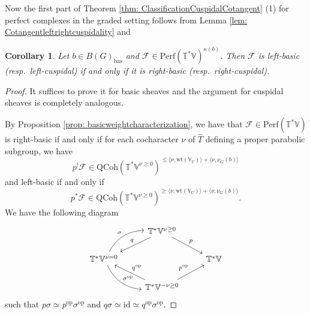 \documentclass{amsart}
\newtheorem{corollary}[theorem]{Corollary}
\theoremstyle{definition}
\theoremstyle{remark}
\numberwithin{equation}{section}
\newcommand{\mc}{\mathcal}
\newcommand{\bas}{\mathrm{bas}}
\newcommand{\op}{\mathrm{op}}
\newcommand{\wh}{\widehat}
\newcommand{\QCoh}{\mathrm{QCoh}}
\newcommand{\id}{\mathrm{id}}
\newcommand{\V}{\mathbb{V}}
\newcommand{\T}{\mathbb{T}}
\newcommand{\Perf}{\mathrm{Perf}}
\newcommand{\wt}{\mathrm{wt}}
\begin{document}
Now the first part of Theorem \ref{thm: ClassificationCuspidalCotangent} (1) for perfect complexes in the graded setting follows from Lemma \ref{lem: Cotangentleftrightcuspidality} and

\begin{corollary}{\label{cor: leftrightbasequal}}
    Let $b \in B(G)_{\bas}$ and $\mathcal{F}\in \Perf(\T^{\ast}\V)^{\kappa(b)}$. Then $\mathcal{F}$ is left-basic (resp.~left-cuspidal) if and only if it is right-basic (resp.~right-cuspidal).
\end{corollary}

\begin{proof}
It suffices to prove it for basic sheaves and the argument for cuspidal sheaves is completely analogous. 

By Proposition \ref{prop: basicweightcharacterization}, we have that $\mc{F}\in \Perf(\T^*\V)$ is right-basic if and only if for each cocharacter $\nu$ of $\wh{T}$ defining a proper parabolic subgroup, we have 
\begin{equation*}
    p^!\mc{F} \in \QCoh(\T^{\ast}\V^{\nu \geq 0})^{ \leq \langle \nu, \wt(\V_U) \rangle + \langle \nu,  \nu_G(b)\rangle}
\end{equation*}
and left-basic if and only if
\begin{equation*}
    p^{\ast}\mc{F} \in \QCoh(\T^{\ast}\V^{\nu \geq 0})^{ \geq \langle \nu, \wt(\V_U) \rangle + \langle \nu,  \nu_G(b)\rangle}.
\end{equation*}
We have the following diagram
\begin{equation*}
    \begin{tikzcd}
        & \T^{\ast}\V^{\nu \geq 0} \arrow[ld, swap, "q"] \arrow[rd, "p"] & \\
        \T^{\ast}\V^{\nu = 0} \arrow[ru, bend left = 30, "\sigma"] \arrow[rd, bend right = 30, "\sigma^{\op}"] & & \T^{\ast}\V \\
        &  \T^{\ast}\V^{-\nu \geq 0} \arrow[lu, swap, "q^{\op}"] \arrow[ru, "p^{\op}"]  &
    \end{tikzcd}
\end{equation*}
such that $p \sigma  \simeq p^{\op} \sigma^{\op}$ and $q \sigma \simeq \id \simeq q^{\op} \sigma^{\op}$.


\end{proof}
\end{document}
